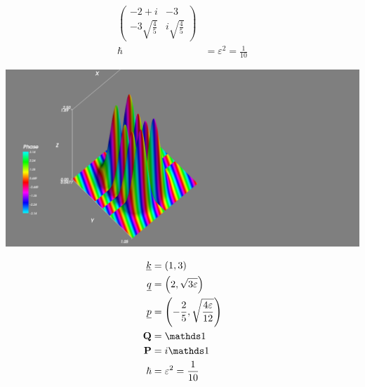 \documentclass[b0paper,portrait,fontscale=0.24]{baposter}
\newcommand{\white}[1]{\textcolor{white}{#1}}
\begin{document}
\begin{poster}
{\begin{minipage}[c]{0.5\linewidth}
\begin{minipage}[c]{0.40\textwidth}
{{\begin{align*}
\begin{pmatrix}
                -2 + i        & -3 \\
                -3 \sqrt{\frac{4}{5}} & i \sqrt{\frac{4}{5}}
              \end{pmatrix} \\[-2.5pt]
              \hbar & = \varepsilon^{2} = \frac{1}{10}
            \end{align*}
          } }
      \end{minipage}
    \end{minipage}
    \begin{minipage}[c]{0.5\linewidth}
      \begin{minipage}[c]{\linewidth}
        \includegraphics[width=\textwidth]{plot2}
      \end{minipage}
      \hspace*{-0.4\textwidth}
      \begin{minipage}[c]{0.36\textwidth}
        { \smaller\white {\smaller
            \begin{align*}
              \vec{k} & = (1,3) \\
              \vec{q} & = \left(2, \sqrt{3\varepsilon}\right) \\
              \vec{p} & = \left(-\frac{2}{5}, \sqrt{\frac{4\varepsilon}{12}}\right) \\
              \mat{Q} & = \id \\
              \mat{P} & = i\id \\
              \hbar & = \varepsilon^{2} = \frac{1}{10}
            \end{align*}
          } }
      \end{minipage}
    \end{minipage}
    \vspace{-1mm}
  }



\end{poster}
\end{document}
